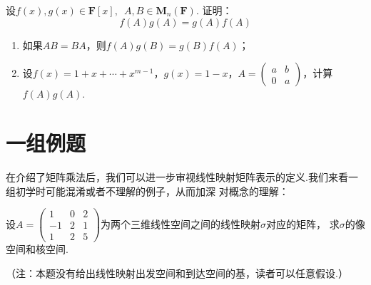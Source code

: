 \begin{example}\label{ex:7:矩阵多项式可交换}
    设$f(x),g(x) \in \mathbf{F}[x],\enspace A,B \in \mathbf{M}_n(\mathbf{F})$. 证明：
    \[f(A)g(A)=g(A)f(A)\]
    \begin{enumerate}
        \item 如果$AB=BA$，则$f(A)g(B)=g(B)f(A)$；

        \item 设$f(x)=1+x+\cdots+x^{m-1}$，$g(x)=1-x$，$A=\begin{pmatrix}
            a & b \\ 0 & a
        \end{pmatrix}$，计算$f(A)g(A)$.
    \end{enumerate}
\end{example}
\begin{solution}

\end{solution}

\section{一组例题}
在介绍了矩阵乘法后，我们可以进一步审视线性映射矩阵表示的定义.我们来看一组初学时可能混淆或者不理解的例子，从而加深
对概念的理解：
\begin{example}\label{ex:7:矩阵表示2}
    设$A=\begin{pmatrix}1 & 0 & 2 \\ -1 & 2 & 1 \\ 1 & 2 & 5\end{pmatrix}$为两个三维线性空间之间的线性映射$\sigma$对应的矩阵，
    求$\sigma$的像空间和核空间.
\end{example}
（注：本题没有给出线性映射出发空间和到达空间的基，读者可以任意假设.）

